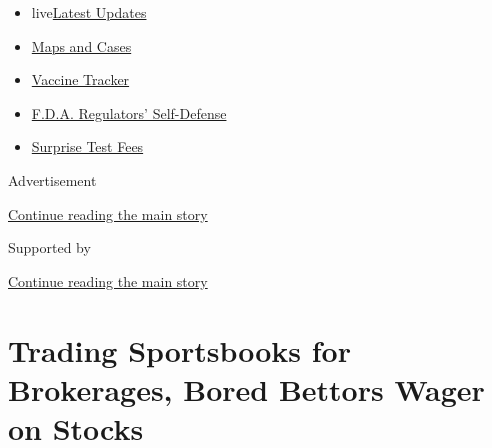 \begin{itemize}
\tightlist
\item
  live\href{https://www.nytimes3xbfgragh.onion/2020/09/12/world/covid-19-coronavirus.html?name=styln-coronavirus-markets\&region=TOP_BANNER\&block=storyline_menu_recirc\&action=click\&pgtype=Article\&impression_id=d268bde1-f52b-11ea-8e9a-cf021cc1e5be\&variant=undefined}{Latest
  Updates}
\item
  \href{https://www.nytimes3xbfgragh.onion/interactive/2020/us/coronavirus-us-cases.html?name=styln-coronavirus-markets\&region=TOP_BANNER\&block=storyline_menu_recirc\&action=click\&pgtype=Article\&impression_id=d268e4f0-f52b-11ea-8e9a-cf021cc1e5be\&variant=undefined}{Maps
  and Cases}
\item
  \href{https://www.nytimes3xbfgragh.onion/interactive/2020/science/coronavirus-vaccine-tracker.html?name=styln-coronavirus-markets\&region=TOP_BANNER\&block=storyline_menu_recirc\&action=click\&pgtype=Article\&impression_id=d268e4f1-f52b-11ea-8e9a-cf021cc1e5be\&variant=undefined}{Vaccine
  Tracker}
\item
  \href{https://www.nytimes3xbfgragh.onion/2020/09/10/us/politics/fda-coronavirus-vaccine.html?name=styln-coronavirus-markets\&region=TOP_BANNER\&block=storyline_menu_recirc\&action=click\&pgtype=Article\&impression_id=d268e4f2-f52b-11ea-8e9a-cf021cc1e5be\&variant=undefined}{F.D.A.
  Regulators' Self-Defense}
\item
  \href{https://www.nytimes3xbfgragh.onion/2020/09/09/upshot/coronavirus-surprise-test-fees.html?name=styln-coronavirus-markets\&region=TOP_BANNER\&block=storyline_menu_recirc\&action=click\&pgtype=Article\&impression_id=d268e4f3-f52b-11ea-8e9a-cf021cc1e5be\&variant=undefined}{Surprise
  Test Fees}
\end{itemize}

Advertisement

\protect\hyperlink{after-top}{Continue reading the main story}

Supported by

\protect\hyperlink{after-sponsor}{Continue reading the main story}

\hypertarget{trading-sportsbooks-for-brokerages-bored-bettors-wager-on-stocks}{%
\section{Trading Sportsbooks for Brokerages, Bored Bettors Wager on
Stocks}\label{trading-sportsbooks-for-brokerages-bored-bettors-wager-on-stocks}}

